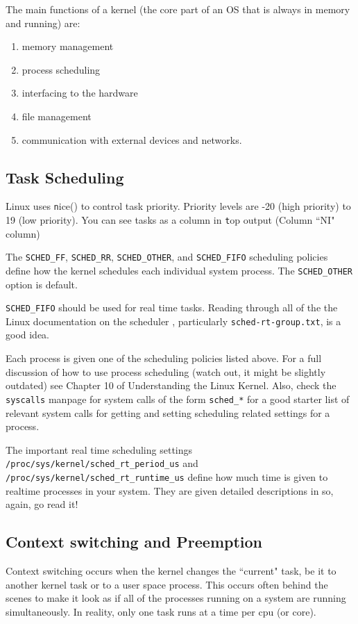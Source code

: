 \documentclass{article}
\begin{document}
The main functions of a kernel (the core part of an OS that is always in memory and running) are\cite{IntroLinuxForRealTime}:
\begin{enumerate}
\item memory management
\item process scheduling
\item interfacing to the hardware
\item file management
\item communication with external devices and networks.
\end{enumerate}

\subsection{Task Scheduling}
Linux uses {\texttt nice()} to control task priority.  Priority levels are -20 (high priority) to 19 (low priority).  You can see tasks as a column in {\texttt top} output (Column ``NI" column)

The {\texttt{SCHED\_FF}, \texttt{SCHED\_RR}, \texttt{SCHED\_OTHER}, and \texttt{SCHED\_FIFO}} scheduling policies define how the kernel schedules each individual system process.  The \texttt{SCHED\_OTHER} option is default.

\texttt{SCHED\_FIFO} should be used for real time tasks. Reading through all of the the Linux documentation on the scheduler \cite{schedulerDocs}, particularly \texttt{sched-rt-group.txt}, is a good idea.

Each process is given one of the scheduling policies listed above.  For a full discussion of how to use process scheduling (watch out, it might be slightly outdated) see Chapter 10 of Understanding the Linux Kernel.\cite{linuxKernelCh10}  Also, check the \texttt{syscalls} manpage for system calls of the form \texttt{sched\_*} for a good starter list of relevant system calls for getting and setting scheduling related settings for a process.

The important real time scheduling settings \texttt{/proc/sys/kernel/sched\_rt\_period\_us} and \texttt{/proc/sys/kernel/sched\_rt\_runtime\_us} define how much time is given to realtime processes in your system.  They are given detailed descriptions in \cite{schedulerDocs} so, again, go read it!

\subsection{Context switching and Preemption}
Context switching occurs when the kernel changes the ``current" task, be it to another kernel task or to a user space process.  This occurs often behind the scenes to make it look as if all of the processes running on a system are running simultaneously.  In reality, only one task runs at a time per cpu (or core).
\end{document}
